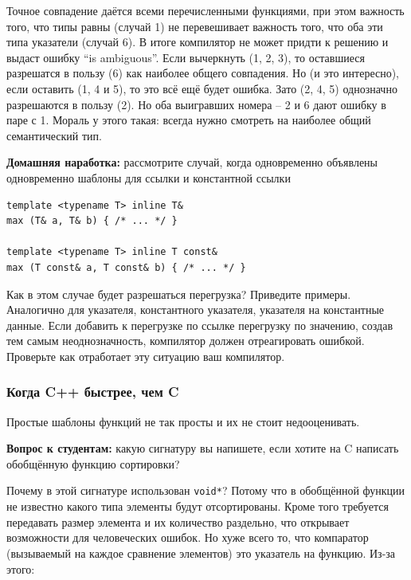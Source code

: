 \documentclass[a4paper,12pt,oneside]{article}
\newif\ifanswers
\begin{document}
Точное совпадение даётся всеми перечисленными функциями, при этом важность того, что типы равны (случай 1) не перевешивает важность того, что оба эти типа указатели (случай 6). В итоге компилятор не может придти к решению и выдаст ошибку ``is ambiguous''. Если вычеркнуть (1, 2, 3), то оставшиеся разрешатся в пользу (6) как наиболее общего совпадения. Но (и это интересно), если оставить (1, 4 и 5), то это всё ещё будет ошибка. Зато (2, 4, 5) однозначно разрешаются в пользу (2). Но оба выигравших номера -- 2 и 6 дают ошибку в паре с 1. Мораль у этого такая: всегда нужно смотреть на наиболее общий семантический тип.
\fi

\textbf{Домашняя наработка:} рассмотрите случай, когда одновременно объявлены одновременно шаблоны для ссылки и константной ссылки

\begin{lstlisting}
template <typename T> inline T& 
max (T& a, T& b) { /* ... */ }

template <typename T> inline T const& 
max (T const& a, T const& b) { /* ... */ }
\end{lstlisting}

Как в этом случае будет разрешаться перегрузка? Приведите примеры. Аналогично для указателя, константного указателя, указателя на константные данные. Если добавить к перегрузке по ссылке перегрузку по значению, создав тем самым неоднозначность, компилятор должен отреагировать ошибкой. Проверьте как отработает эту ситуацию ваш компилятор.

\subsubsection{Когда C++ быстрее, чем C}\label{CppBetterC}

Простые шаблоны функций не так просты и их не стоит недооценивать. 

\textbf{Вопрос к студентам:} какую сигнатуру вы напишете, если хотите на C написать обобщённую функцию сортировки? 

\ifanswers
Ответ: стандарт языка C99 регламентирует (пункт 7.20.5.2) следующую сигнатуру:

\begin{lstlisting}
void qsort(void *base, size_t nmemb, size_t size, 
           int (*compar)(const void *, const void *));
\end{lstlisting}
\fi

Почему в этой сигнатуре использован \lstinline!void*!? Потому что в обобщённой функции не известно какого типа элементы будут отсортированы. Кроме того требуется передавать размер элемента и их количество раздельно, что открывает возможности для человеческих ошибок. Но хуже всего то, что компаратор (вызываемый на каждое сравнение элементов) это указатель на функцию. Из-за этого:
\end{document}
